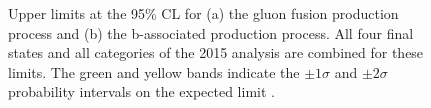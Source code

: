 \begin{figure}[h!]
\begin{center}
\end{center}
\caption[Upper limits at the 95\% CL for the gluon fusion and b-associated production process.]{Upper limits at the 95\% \ac{CL} for (a) the gluon fusion production
process and (b) the b-associated production process. All four final states and 
all categories of the 2015 analysis are combined for these limits. The green and yellow bands indicate
the $\pm 1\sigma$ and $\pm 2\sigma$ probability intervals on the expected limit \cite{CMS-PAS-HIG-16-006}.}
\label{fig:mssm_results_hig16006_limits}
\end{figure}
\clearpage
